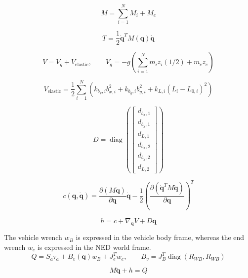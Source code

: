 \documentclass[11pt]{article}
\begin{document}
\begin{equation}
M=\sum_{i=1}^{N}M_i+M_e\label{eq:mass-assembly}
\end{equation}

\begin{equation}
T=\frac12\dot{\boldsymbol q}^{T}M(\boldsymbol q)\dot{\boldsymbol q}
\end{equation}

\begin{equation}
V=V_g+V_{\mathrm{elastic}},\qquad V_g=-g\!\left(\sum_{i=1}^{N}m_i z_i(1/2)+m_ez_e\right)
\end{equation}

\begin{equation}
V_{\mathrm{elastic}}=\frac12\sum_{i=1}^{N}\left(k_{b_x,i}b_{x,i}^{2}+k_{b_y,i}b_{y,i}^{2}+k_{L,i}(L_i-L_{0,i})^2\right)
\end{equation}

\begin{equation}
D=\operatorname{diag}\!\left(\begin{bmatrix}d_{b_x,1}\\d_{b_y,1}\\d_{L,1}\\d_{b_x,2}\\d_{b_y,2}\\d_{L,2}\end{bmatrix}\right)
\end{equation}

\begin{equation}
c(\boldsymbol q,\dot{\boldsymbol q})=\frac{\partial(M\dot{\boldsymbol q})}{\partial\boldsymbol q}\dot{\boldsymbol q}-\frac12\left(\frac{\partial(\dot{\boldsymbol q}^{T}M\dot{\boldsymbol q})}{\partial\boldsymbol q}\right)^T
\end{equation}

\begin{equation}
h=c+\nabla_{\boldsymbol q}V+D\dot{\boldsymbol q}
\end{equation}

The vehicle wrench $w_B$ is expressed in the vehicle body frame, whereas the end wrench $w_e$ is expressed in the NED world frame.
\begin{equation}
Q=S_a\tau_a+B_v(\boldsymbol q)w_B+J_e^Tw_e,\qquad B_v=J_B^T\operatorname{diag}(R_{WB},R_{WB})
\end{equation}

\begin{equation}
M\ddot{\boldsymbol q}+h=Q\label{eq:dynamics}
\end{equation}
\end{document}
